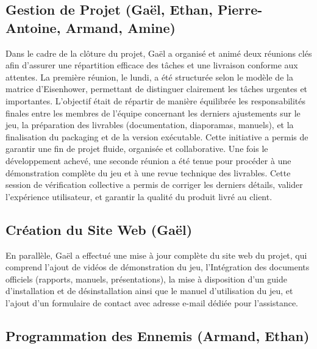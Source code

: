 \documentclass{report}
\begin{document}
\subsection*{Gestion de Projet (Gaël, Ethan, Pierre-Antoine, Armand, Amine)}
Dans le cadre de la clôture du projet, Gaël a organisé et animé deux réunions clés afin d'assurer une répartition efficace des tâches et une livraison conforme aux attentes. La première réunion, le lundi, a été structurée selon le modèle de la matrice d’Eisenhower, permettant de distinguer clairement les tâches urgentes et importantes. L’objectif était de répartir de manière équilibrée les responsabilités finales entre les membres de l’équipe concernant les derniers ajustements sur le jeu, la préparation des livrables (documentation, diaporamas, manuels), et la finalisation du packaging et de la version exécutable. Cette initiative a permis de garantir une fin de projet fluide, organisée et collaborative. Une fois le développement achevé, une seconde réunion a été tenue pour procéder à une démonstration complète du jeu et à une revue technique des livrables. Cette session de vérification collective a permis de corriger les derniers détails, valider l’expérience utilisateur, et garantir la qualité du produit livré au client.


\subsection*{Création du Site Web (Gaël)}
En parallèle, Gaël a effectué une mise à jour complète du site web du projet, qui comprend l’ajout de vidéos de démonstration du jeu, l’Intégration des documents officiels (rapports, manuels, présentations), la mise à disposition d’un guide d’installation et de désinstallation ainsi que le manuel d’utilisation du jeu, et l’ajout d’un formulaire de contact avec adresse e-mail dédiée pour l’assistance.


\subsection*{Programmation des Ennemis (Armand, Ethan)}
\end{document}
